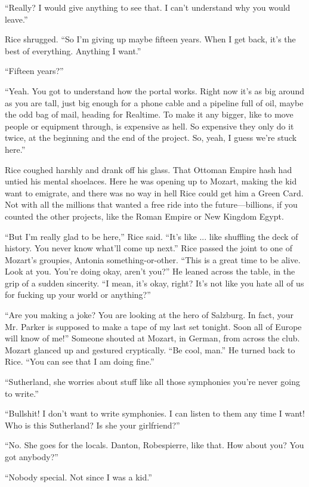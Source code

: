 ``Really? I would give anything to see that. I can't understand why you would leave.''

Rice shrugged. ``So I'm giving up maybe fifteen years. When I get back, it's the best of everything. Anything I want.''

``Fifteen years?''

``Yeah. You got to understand how the portal works. Right now it's as big around as you are tall, just big enough for a phone cable and a pipeline full of oil, maybe the odd bag of mail, heading for Realtime. To make it any bigger, like to move people or equipment through, is expensive as hell. So expensive they only do it twice, at the beginning and the end of the project. So, yeah, I guess we're stuck here.''

Rice coughed harshly and drank off his glass. That Ottoman Empire hash had untied his mental shoelaces. Here he was opening up to Mozart, making the kid want to emigrate, and there was no way in hell Rice could get him a Green Card. Not with all the millions that wanted a free ride into the future—billions, if you counted the other projects, like the Roman Empire or New Kingdom Egypt.

``But I'm really glad to be here,'' Rice said. ``It's like ... like shuffling the deck of history. You never know what'll come up next.'' Rice passed the joint to one of Mozart's groupies, Antonia something-or-other. ``This is a great time to be alive. Look at you. You're doing okay, aren't you?'' He leaned across the table, in the grip of a sudden sincerity. ``I mean, it's okay, right? It's not like you hate all of us for fucking up your world or anything?''

``Are you making a joke? You are looking at the hero of Salzburg. In fact, your Mr. Parker is supposed to make a tape of my last set tonight. Soon all of Europe will know of me!'' Someone shouted at Mozart, in German, from across the club. Mozart glanced up and gestured cryptically. ``Be cool, man.'' He turned back to Rice. ``You can see that I am doing fine.''

``Sutherland, she worries about stuff like all those symphonies you're never going to write.''

``Bullshit! I don't want to write symphonies. I can listen to them any time I want! Who is this Sutherland? Is she your girlfriend?''

``No. She goes for the locals. Danton, Robespierre, like that. How about you? You got anybody?''

``Nobody special. Not since I was a kid.''

